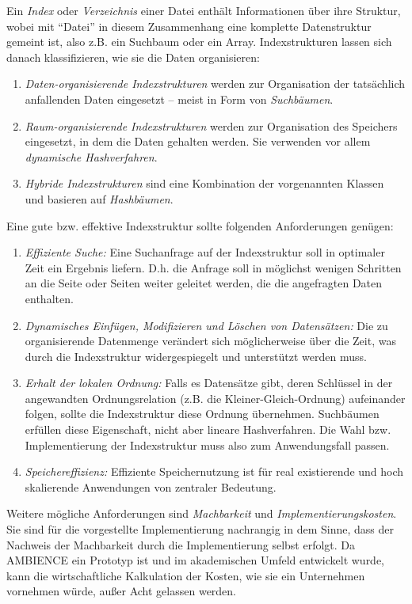 Ein \textit{Index} oder \textit{Verzeichnis} einer Datei enthält Informationen über ihre Struktur, wobei mit "`Datei"' in diesem Zusammenhang eine komplette Datenstruktur gemeint ist, also z.B. ein Suchbaum oder ein Array. Indexstrukturen lassen sich danach klassifizieren, wie sie die Daten organisieren: 
\begin{enumerate}
\setlength{\itemsep}{20pt}
	\item \textit{Daten-organisierende Indexstrukturen} werden zur Organisation der tatsächlich anfallenden Daten eingesetzt -- meist in Form von \textit{Suchbäumen}. 
	\item \textit{Raum-organisierende Indexstrukturen} werden zur Organisation des Speichers eingesetzt, in dem die Daten gehalten werden. Sie verwenden vor allem \textit{dynamische Hashverfahren}. 
	\item \textit{Hybride Indexstrukturen} sind eine Kombination der vorgenannten Klassen und basieren auf \textit{Hashbäumen}.   
\end{enumerate}
Eine gute bzw. effektive Indexstruktur sollte folgenden Anforderungen genügen: 
\begin{enumerate}
\setlength{\itemsep}{20pt}
	\item \textit{Effiziente Suche:} Eine Suchanfrage auf der Indexstruktur soll in optimaler Zeit ein Ergebnis liefern. D.h. die Anfrage soll in möglichst wenigen Schritten an die Seite oder Seiten weiter geleitet werden, die die angefragten Daten enthalten.
	\item \textit{Dynamisches Einfügen, Modifizieren und Löschen von Datensätzen:} Die zu organisierende Datenmenge verändert sich möglicherweise über die Zeit, was durch die Indexstruktur widergespiegelt und unterstützt werden muss.  
	\item \textit{Erhalt der lokalen Ordnung:} Falls es Datensätze gibt, deren Schlüssel in der angewandten Ordnungsrelation (z.B. die Kleiner-Gleich-Ordnung) aufeinander folgen, sollte die Indexstruktur diese Ordnung übernehmen. Suchbäumen erfüllen diese Eigenschaft, nicht aber lineare Hashverfahren. Die Wahl bzw. Implementierung der Indexstruktur muss also zum Anwendungsfall passen. 
	\item \textit{Speichereffizienz:} Effiziente Speichernutzung ist für real existierende und hoch skalierende Anwendungen von zentraler Bedeutung. 
\end{enumerate}
Weitere mögliche Anforderungen sind \textit{Machbarkeit} und \textit{Implementierungskosten}. Sie sind für die vorgestellte Implementierung nachrangig in dem Sinne, dass der Nachweis der Machbarkeit durch die Implementierung selbst erfolgt. Da AMBIENCE ein Prototyp ist und im akademischen Umfeld entwickelt wurde, kann die wirtschaftliche Kalkulation der Kosten, wie sie ein Unternehmen vornehmen würde, außer Acht gelassen werden. 

